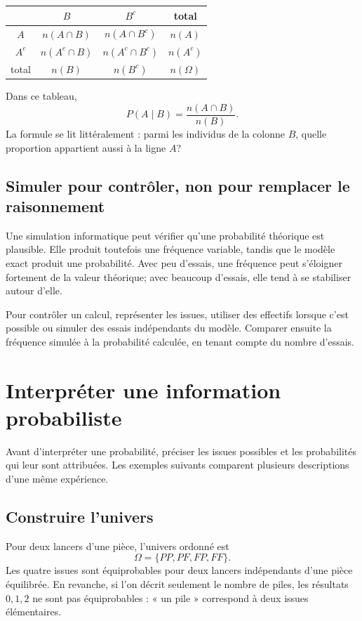 \begin{center}
\begin{tabular}{c|cc|c}
 & $B$ & $B^c$ & total\\\hline
$A$ & $n(A\cap B)$ & $n(A\cap B^c)$ & $n(A)$\\
$A^c$ & $n(A^c\cap B)$ & $n(A^c\cap B^c)$ & $n(A^c)$\\\hline
total & $n(B)$ & $n(B^c)$ & $n(\Omega)$
\end{tabular}
\end{center}

Dans ce tableau,
\[
P(A\mid B)=\frac{n(A\cap B)}{n(B)}.
\]
La formule se lit littéralement : parmi les individus de la colonne $B$, quelle proportion appartient aussi à la ligne $A$?

\subsection{Simuler pour contrôler, non pour remplacer le raisonnement}
Une simulation informatique peut vérifier qu'une probabilité théorique est plausible. Elle produit toutefois une fréquence variable, tandis que le modèle exact produit une probabilité. Avec peu d'essais, une fréquence peut s'éloigner fortement de la valeur théorique; avec beaucoup d'essais, elle tend à se stabiliser autour d'elle.

\begin{visualbox}
Pour contrôler un calcul, représenter les issues, utiliser des effectifs lorsque c'est possible ou simuler des essais indépendants du modèle. Comparer ensuite la fréquence simulée à la probabilité calculée, en tenant compte du nombre d'essais.
\end{visualbox}


\section{Interpréter une information probabiliste}
\label{manual:section:08.09}

Avant d'interpréter une probabilité, préciser les issues possibles et les probabilités qui leur sont attribuées. Les exemples suivants comparent plusieurs descriptions d'une même expérience.

\subsection{Construire l'univers}

Pour deux lancers d'une pièce, l'univers ordonné est
\[
\Omega=\{PP,PF,FP,FF\}.
\]
Les quatre issues sont équiprobables pour deux lancers indépendants d'une pièce équilibrée. En revanche, si l'on décrit seulement le nombre de piles, les résultats $0,1,2$ ne sont pas équiprobables : « un pile » correspond à deux issues élémentaires.

